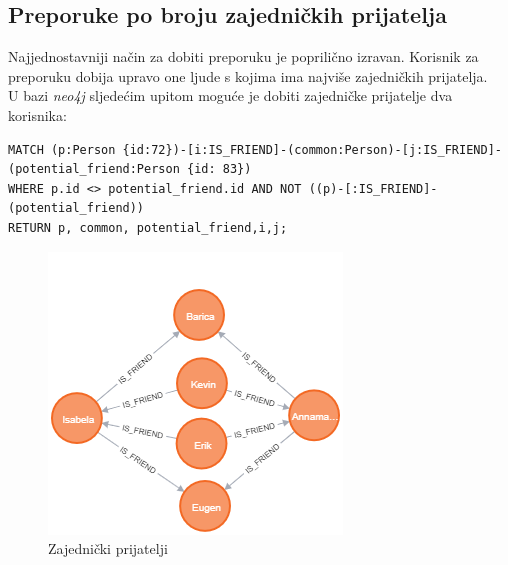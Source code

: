 \documentclass[titlepage, 12pt]{scrartcl}
\begin{document}
\subsection*{Preporuke po broju zajedničkih prijatelja}
Najjednostavniji način za dobiti preporuku je poprilično izravan. Korisnik za preporuku dobija upravo one ljude s kojima ima najviše zajedničkih prijatelja. \\
U bazi \emph{neo4j} sljedećim upitom moguće je dobiti zajedničke prijatelje dva korisnika:
\begin{samepage}
\begin{verbatim}
MATCH (p:Person {id:72})-[i:IS_FRIEND]-(common:Person)-[j:IS_FRIEND]-
(potential_friend:Person {id: 83}) 
WHERE p.id <> potential_friend.id AND NOT ((p)-[:IS_FRIEND]-(potential_friend)) 
RETURN p, common, potential_friend,i,j;
\end{verbatim}
\end{samepage}
\begin{figure}[h]
    \centering
    \includegraphics[scale=0.7]{slike/common_friends_query.png}
    \caption{Zajednički prijatelji}
    \label{fig:common_friends}
\end{figure}
\end{document}
